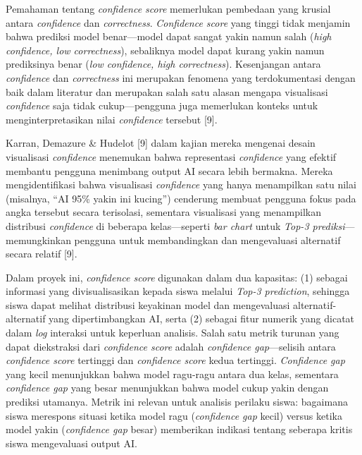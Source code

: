 \documentclass[12pt,oneside]{report}
\begin{document}
Pemahaman tentang \textit{confidence score} memerlukan pembedaan yang krusial antara \textit{confidence} dan \textit{correctness}. \textit{Confidence score} yang tinggi tidak menjamin bahwa prediksi model benar—model dapat sangat yakin namun salah (\textit{high confidence, low correctness}), sebaliknya model dapat kurang yakin namun prediksinya benar (\textit{low confidence, high correctness}). Kesenjangan antara \textit{confidence} dan \textit{correctness} ini merupakan fenomena yang terdokumentasi dengan baik dalam literatur dan merupakan salah satu alasan mengapa visualisasi \textit{confidence} saja tidak cukup—pengguna juga memerlukan konteks untuk menginterpretasikan nilai \textit{confidence} tersebut [9].

Karran, Demazure \& Hudelot [9] dalam kajian mereka mengenai desain visualisasi \textit{confidence} menemukan bahwa representasi \textit{confidence} yang efektif membantu pengguna menimbang output AI secara lebih bermakna. Mereka mengidentifikasi bahwa visualisasi \textit{confidence} yang hanya menampilkan satu nilai (misalnya, ``AI 95\% yakin ini kucing'') cenderung membuat pengguna fokus pada angka tersebut secara terisolasi, sementara visualisasi yang menampilkan distribusi \textit{confidence} di beberapa kelas—seperti \textit{bar chart} untuk \textit{Top-3 prediksi}—memungkinkan pengguna untuk membandingkan dan mengevaluasi alternatif secara relatif [9].

Dalam proyek ini, \textit{confidence score} digunakan dalam dua kapasitas: (1) sebagai informasi yang divisualisasikan kepada siswa melalui \textit{Top-3 prediction}, sehingga siswa dapat melihat distribusi keyakinan model dan mengevaluasi alternatif-alternatif yang dipertimbangkan AI, serta (2) sebagai fitur numerik yang dicatat dalam \textit{log} interaksi untuk keperluan analisis. Salah satu metrik turunan yang dapat diekstraksi dari \textit{confidence score} adalah \textit{confidence gap}—selisih antara \textit{confidence score} tertinggi dan \textit{confidence score} kedua tertinggi. \textit{Confidence gap} yang kecil menunjukkan bahwa model ragu-ragu antara dua kelas, sementara \textit{confidence gap} yang besar menunjukkan bahwa model cukup yakin dengan prediksi utamanya. Metrik ini relevan untuk analisis perilaku siswa: bagaimana siswa merespons situasi ketika model ragu (\textit{confidence gap} kecil) versus ketika model yakin (\textit{confidence gap} besar) memberikan indikasi tentang seberapa kritis siswa mengevaluasi output AI.

\end{document}
